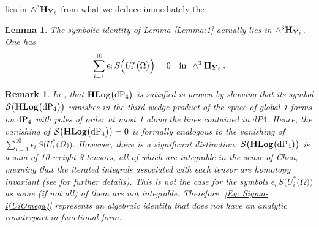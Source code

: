 \documentclass[11pt]{amsart}
\newtheorem{lem}[thm]{Lemma}
\newtheorem{rem}[thm]{Remark}
\begin{document}
  lies in $ \wedge^3
 {\bf H}_{\boldsymbol{Y}_5}$ from what we deduce immediately the 
 \begin{lem}  
 The symbolic identity 
  of Lemma  \ref{Lemma:1} actually lies in $ \wedge^3
 {\bf H}_{\boldsymbol{Y}_5}$. One has 
\begin{equation}
\label{Eq: Sigma-i(UiOmega)}
 \sum_{i=1}^{10} \epsilon_i \,  S\Big(  U_i^*\big(\Omega\big)\Big)=0
 \quad \mbox{in  } \, \wedge^3
 {\bf H}_{\boldsymbol{Y}_5}\, . 
 \end{equation}
 \end{lem}

\begin{rem} %
\noindent 
In \cite{CP}, that ${\bf HLog}\big({\rm dP}_4\big)$ is satisfied is proven by showing that its symbol $\mathcal S\big( {\bf HLog}\big({\rm dP}_4\big)\big)$   vanishes in the third wedge product of the space of global 1-forms on ${\rm dP}_4$ with poles of order at most 1 along the lines contained in \( dP4 \). Hence, the vanishing of $\mathcal S\big( {\bf HLog}\big({\rm dP}_4\big)\big)=0$  is formally analogous to the vanishing of 
$\sum_{i=1}^{10} \epsilon_i \,  S\big(  U_i^*\big(\Omega\big)\big)$. 
However, there is a significant distinction: $\mathcal S\big( {\bf HLog}\big({\rm dP}_4\big)\big)$   is a sum of 10 weight 3 tensors, all of which are integrable in the sense of Chen, meaning that the iterated integrals associated with each tensor are homotopy invariant (see \cite[\S6]{Brown}  for further details). This is not the case for the symbols 
 $ \epsilon_i \,  S\big(  U_i^*\big(\Omega\big)\big)$
 as some (if not all) of them are not integrable. Therefore, \eqref{Eq: Sigma-i(UiOmega)} represents an algebraic identity that does not have an analytic counterpart in functional form.
\end{rem} %
\end{document}
